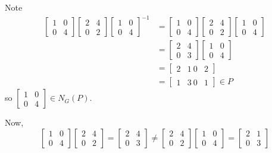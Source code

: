 \documentclass[12pt]{AlgebraQual}
\begin{document}
\begin{solution}
\begin{enumerate}[label=(\alph*)]
    Note \begin{align*}
        \begin{bmatrix}
    1 & 0\\
    0 & 4
    \end{bmatrix}\begin{bmatrix}
    2 & 4\\
    0 & 2
    \end{bmatrix}\begin{bmatrix}
    1 & 0\\
    0 & 4
    \end{bmatrix}^{-1}&=\begin{bmatrix}
    1 & 0\\
    0 & 4
    \end{bmatrix}\begin{bmatrix}
    2 & 4\\
    0 & 2
    \end{bmatrix}\begin{bmatrix}
    1 & 0\\
    0 & 4
    \end{bmatrix}\\
    &=\begin{bmatrix}
    2 & 4\\
    0 & 3
    \end{bmatrix}\begin{bmatrix}
    1 & 0\\
    0 & 4
    \end{bmatrix}\\
    &=\begin{bmatrix}
    2 & 1\
    0 & 2
    \end{bmatrix}\\
    &=\begin{bmatrix}
    1 & 3\
    0 & 1
    \end{bmatrix}\in P
    \end{align*} so $\begin{bmatrix}
    1 & 0\\
    0 & 4
    \end{bmatrix}\in N_G(P).$

    Now, $$\begin{bmatrix}
    1 & 0\\
    0 & 4
    \end{bmatrix}\begin{bmatrix}
    2 & 4\\
    0 & 2
    \end{bmatrix}=\begin{bmatrix}
    2 & 4\\
    0 & 3
    \end{bmatrix}\not=\begin{bmatrix}
    2 & 4\\
    0 & 2
    \end{bmatrix}\begin{bmatrix}
    1 & 0\\
    0 & 4
    \end{bmatrix}=\begin{bmatrix}
    2 & 1\\
    0 & 3
    \end{bmatrix}$$


\end{enumerate}
\end{solution}
\end{document}
